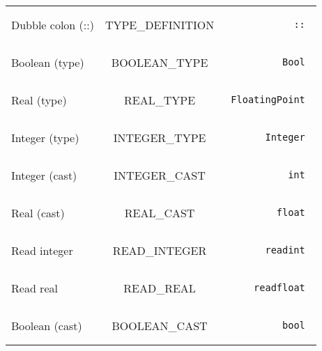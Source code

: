 \documentclass[a4paper,10pt]{article}
\begin{document}
\begin{tabular}{|l|c|r|}
  Dubble colon (::) & TYPE\_DEFINITION & \begin{minipage}{2in} \begin{verbatim} :: \end{verbatim} \end{minipage} \\
  Boolean (type)  & BOOLEAN\_TYPE & \begin{minipage}{2in} \begin{verbatim} Bool \end{verbatim} \end{minipage} \\
  Real (type) & REAL\_TYPE & \begin{minipage}{2in} \begin{verbatim} FloatingPoint \end{verbatim} \end{minipage} \\
  Integer (type) & INTEGER\_TYPE & \begin{minipage}{2in} \begin{verbatim} Integer \end{verbatim} \end{minipage} \\
  Integer (cast) & INTEGER\_CAST & \begin{minipage}{2in} \begin{verbatim} int \end{verbatim} \end{minipage} \\
  Real (cast) & REAL\_CAST & \begin{minipage}{2in} \begin{verbatim} float \end{verbatim} \end{minipage} \\
  Read integer & READ\_INTEGER & \begin{minipage}{2in} \begin{verbatim} readint \end{verbatim} \end{minipage} \\
  Read real & READ\_REAL & \begin{minipage}{2in} \begin{verbatim} readfloat \end{verbatim} \end{minipage} \\
  Boolean (cast) & BOOLEAN\_CAST & \begin{minipage}{2in} \begin{verbatim} bool \end{verbatim} \end{minipage} \\

\end{tabular}
\end{document}
